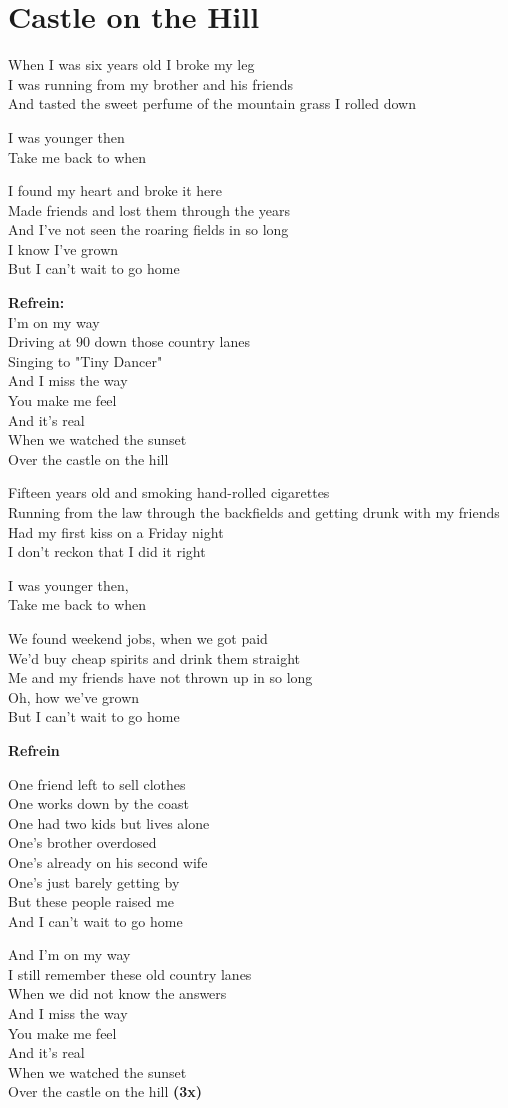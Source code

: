 \section{Castle on the Hill}
When I was six years old I broke my leg\\
I was running from my brother and his friends\\
And tasted the sweet perfume of the mountain grass I rolled down

I was younger then\\
Take me back to when

I found my heart and broke it here\\
Made friends and lost them through the years\\
And I've not seen the roaring fields in so long\\
I know I've grown\\
But I can't wait to go home

\textbf{Refrein:}\\
I'm on my way\\
Driving at 90 down those country lanes\\
Singing to "Tiny Dancer"\\
And I miss the way\\
You make me feel\\
And it's real\\
When we watched the sunset\\
Over the castle on the hill

Fifteen years old and smoking hand-rolled cigarettes\\
Running from the law through the backfields and getting drunk with my friends\\
Had my first kiss on a Friday night\\
I don't reckon that I did it right

I was younger then,\\
Take me back to when

We found weekend jobs, when we got paid\\
We'd buy cheap spirits and drink them straight\\
Me and my friends have not thrown up in so long\\
Oh, how we've grown\\
But I can't wait to go home

\textbf{Refrein}

One friend left to sell clothes\\
One works down by the coast\\
One had two kids but lives alone\\
One's brother overdosed\\
One's already on his second wife\\
One's just barely getting by\\
But these people raised me\\
And I can't wait to go home

And I'm on my way\\
I still remember these old country lanes\\
When we did not know the answers\\
And I miss the way\\
You make me feel\\
And it's real\\
When we watched the sunset\\
Over the castle on the hill \textbf{(3x)}\\
